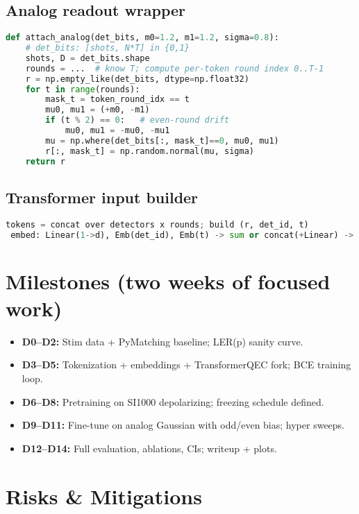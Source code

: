 \documentclass[12pt]{article}
\begin{document}
\subsection{Analog readout wrapper}

\begin{lstlisting}[language=Python]
def attach_analog(det_bits, m0=1.2, m1=1.2, sigma=0.8):
    # det_bits: [shots, N*T] in {0,1}
    shots, D = det_bits.shape
    rounds = ...  # know T; compute per-token round index 0..T-1
    r = np.empty_like(det_bits, dtype=np.float32)
    for t in range(rounds):
        mask_t = token_round_idx == t
        mu0, mu1 = (+m0, -m1)
        if (t % 2) == 0:   # even-round drift
            mu0, mu1 = -mu0, -mu1
        mu = np.where(det_bits[:, mask_t]==0, mu0, mu1)
        r[:, mask_t] = np.random.normal(mu, sigma)
    return r
\end{lstlisting}

\subsection{Transformer input builder}

\begin{lstlisting}[language=Python]
 tokens = concat over detectors x rounds; build (r, det_id, t)
 embed: Linear(1->d), Emb(det_id), Emb(t) -> sum or concat(+Linear) -> Transformer
\end{lstlisting}

\section{Milestones (two weeks of focused work)}

\begin{itemize}
    \item \textbf{D0--D2:} Stim data + PyMatching baseline; LER(p) sanity curve.
    \item \textbf{D3--D5:} Tokenization + embeddings + TransformerQEC fork; BCE training loop.
    \item \textbf{D6--D8:} Pretraining on SI1000 depolarizing; freezing schedule defined.
    \item \textbf{D9--D11:} Fine-tune on analog Gaussian with odd/even bias; hyper sweeps.
    \item \textbf{D12--D14:} Full evaluation, ablations, CIs; writeup + plots.
\end{itemize}

\section{Risks \& Mitigations}
\end{document}

